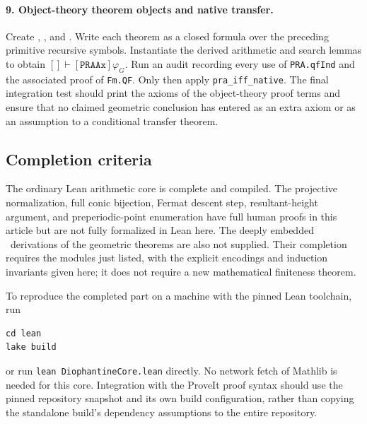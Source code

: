 \paragraph{9. Object-theory theorem objects and native transfer.}
Create , , and
.  Write each theorem as a closed formula
over the preceding primitive recursive symbols.  Instantiate the
derived arithmetic and search lemmas to obtain
$[]\vdash[\mathtt{PRAAx}]\varphi_G$.  Run an audit recording every use
of \texttt{PRA.qfInd} and the associated proof of
\texttt{Fm.QF}.  Only then apply \texttt{pra\_iff\_native}.
The final integration test should print the axioms of the object-theory
proof terms and ensure that no claimed geometric conclusion has entered
as an extra axiom or as an assumption to a conditional transfer theorem.

\subsection{Completion criteria}

The ordinary Lean arithmetic core is complete and compiled.  The
projective normalization, full conic bijection, Fermat descent step,
resultant-height argument, and preperiodic-point enumeration have full
human proofs in this article but are not fully formalized in Lean here.
The deeply embedded \iPRA\ derivations of the geometric theorems are
also not supplied.  Their completion requires the modules just listed,
with the explicit encodings and induction invariants given here; it does
not require a new mathematical finiteness theorem.

To reproduce the completed part on a machine with the pinned Lean
toolchain, run
\begin{verbatim}
cd lean
lake build
\end{verbatim}
or run \texttt{lean DiophantineCore.lean} directly.  No network fetch of
Mathlib is needed for this core.  Integration with the ProveIt proof
syntax should use the pinned repository snapshot and its own build
configuration, rather than copying the standalone build's dependency
assumptions to the entire repository.
